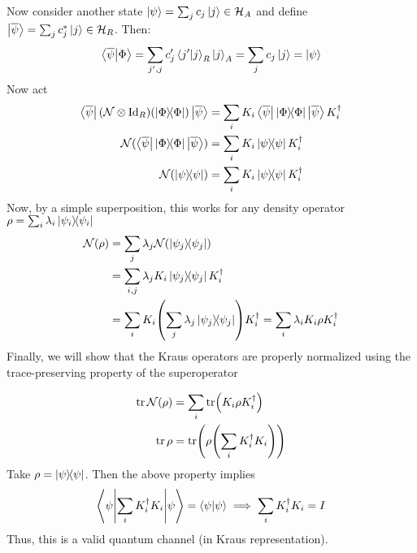\begin{theorem}
    Now consider another state $\ket{\psi} = \sum_j c_j \ket{j} \in \operatorname{\mathcal{H}}_A$ and
    define $\ket{\overline{\psi}} = \sum_j c_j^* \ket{j} \in \operatorname{\mathcal{H}}_R$. Then:
    \[ \bra{\overline{\psi}}\ket{\Phi} = \sum_{j', j} c_j' \braket{j'}{j}_R \ket{j}_A = \sum_j c_j \ket{j} = \ket{\psi} \]
    Now act
    \begin{align*}
        \bra{\overline{\psi}} \qty(\mathcal{N} \otimes \textrm{Id}_R)\qty(\ketbra{\Phi}) \ket{\overline{\psi}} &= \sum_i K_i \bra{\overline{\psi}} \ketbra{\Phi} \ket{\overline{\psi}} K_i^{\dagger} \\
        \mathcal{N}( \bra{\overline{\psi}} \ketbra{\Phi}  \ket{\overline{\psi}}) &= \sum_i K_i \ketbra{\psi} K_i^{\dagger} \\
        \mathcal{N}(\ketbra{\psi}) &= \sum_i K_i \ketbra{\psi} K_i^{\dagger}
    \end{align*}
    Now, by a simple superposition, this works for any density operator $\rho = \sum_i \lambda_i \ketbra{\psi_i}$
    \begin{align*}
        \mathcal{N}(\rho) &= \sum_j \lambda_j \mathcal{N}(\ketbra{\psi_j}) \\
        &= \sum_{i, j} \lambda_j K_i \ketbra{\psi_j} K_i^{\dagger} \\
        &= \sum_{i} K_i \qty(\sum_{j} \lambda_j\ketbra{\psi_j}) K_i^{\dagger} = \sum_i \lambda_i K_i \rho K_i^{\dagger}
    \end{align*}
    Finally, we will show that the Kraus operators are properly normalized using the trace-preserving property of
    the superoperator
    
    \begin{align*}
        \tr \mathcal{N}(\rho) &= \sum_i \tr(K_i \rho K_i^{\dagger}) \\
        \tr \rho &= \tr(\rho \qty(\sum_i K_i^{\dagger} K_i))
    \end{align*}
    Take $\rho = \ketbra{\psi}$. Then the above property implies
    \[ \mel**{\psi}{\sum_i K_i^{\dagger} K_i}{\psi} = \braket{\psi} \implies \sum_i K_i^{\dagger} K_i = I \]
    Thus, this is a valid quantum channel (in Kraus representation).
\end{theorem}

